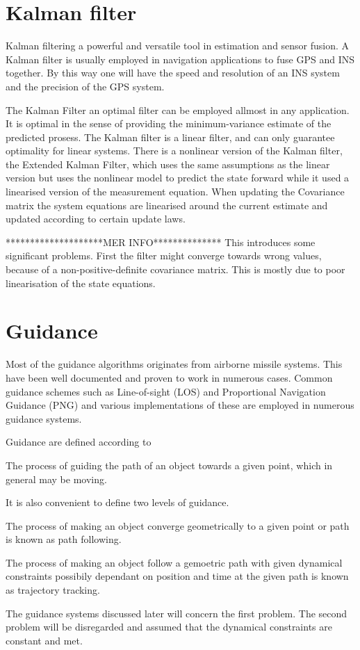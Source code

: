 \section{Kalman filter}
	Kalman filtering a powerful and versatile tool in estimation and sensor fusion. A Kalman filter is
	usually employed in navigation applications to fuse GPS and INS together. By this way one will have
	the speed and resolution of an INS system and the precision of the GPS system.
	
	The Kalman Filter an optimal filter can be employed allmost in any application. It is optimal in 
	the sense of providing the minimum-variance estimate of the predicted prosess.  The Kalman 
	filter is a linear filter, and can only
	guarantee optimality for linear systems. There is a nonlinear version of the Kalman filter, the
	Extended Kalman Filter, which uses the same assumptions as the linear version but uses the nonlinear
	model to predict the state forward while it used a linearised version of the measurement equation. 
	When updating the Covariance matrix the system equations are linearised around the current estimate 
	and updated according to certain update laws. 
	
	********************MER INFO**************
	This introduces
	some significant problems. First the filter might converge towards wrong values, because of a 
	non-positive-definite covariance matrix. This is mostly due to poor linearisation of the state 
	equations. \cite{kalman}
	
\section{Guidance}
        \label{chap1-guidance-alg}
	Most of the guidance algorithms originates from airborne missile systems. This have been well
	documented and proven to work in numerous cases. Common guidance schemes such as Line-of-sight (LOS)
	and Proportional Navigation Guidance (PNG) and various implementations of these are employed in
	numerous guidance systems. 
	
	Guidance are defined according to \cite{guidance_def}
	\begin{definition}
		\label{def:ch1_guidance}
		The process of guiding the path of an object towards a given point, which in general may be
		moving.
	\end{definition}
	It is also convenient to define two levels of guidance.
	\begin{definition}
		The process of making an object converge geometrically to a given point or path is known as
		path following.
	\end{definition}
	\begin{definition}
		The process of making an object follow a gemoetric path with given dynamical constraints
		possibily dependant on position and time at the given path is known as trajectory tracking.
	\end{definition}
	The guidance systems discussed later will concern the first problem. The second problem will be
	disregarded and assumed that the dynamical constraints are constant and met. \cite{guidance-path-2d-3d}

